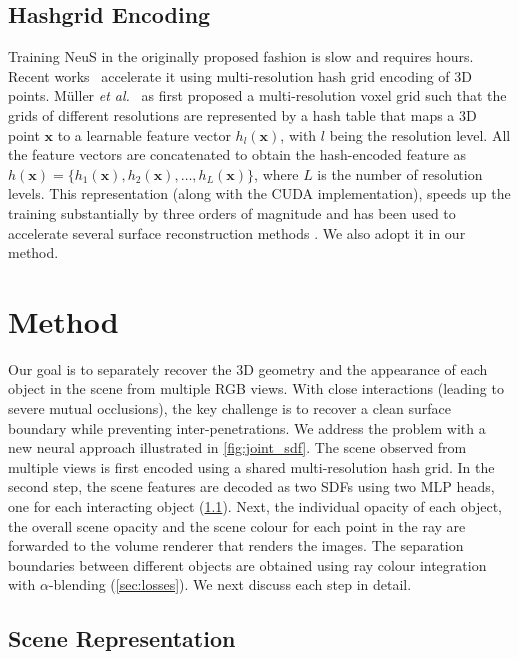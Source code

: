 \subsection{Hashgrid Encoding}
Training NeuS in the originally proposed fashion is slow and requires hours. 
Recent works~\cite{mueller2022instant, zhao2022instantnsr, neus2, rosu2023permutosdf} accelerate it using 
multi-resolution hash grid encoding of 3D points. 
Müller \textit{et al.}~\cite{mueller2022instant} as first proposed a multi-resolution voxel grid such that the grids of different resolutions are represented by a hash table that maps a 3D point $\mathbf{x}$ to a learnable feature vector $h_l(\mathbf{x})$, with $l$ being the resolution level. 
All the feature vectors are concatenated to obtain the hash-encoded feature as $h(\mathbf{x}) = \{h_1(\mathbf{x}), h_2(\mathbf{x}), \ldots, h_L(\mathbf{x})\}$, where $L$ is the number of resolution levels. 
This representation (along with the CUDA implementation), speeds up the training substantially by three orders of magnitude and has been used to accelerate several surface reconstruction methods \cite{neus2, zhao2022instantnsr}.
We also adopt it in our method. 


\section{Method} 
\label{sec:Method} 
Our goal is to separately recover the 3D geometry and the appearance of each object in the scene from multiple RGB views. 
With close interactions (leading to severe mutual occlusions), the key challenge is to recover a clean surface boundary while preventing inter-penetrations. 
We address the problem with a new neural approach illustrated in \cref{fig:joint_sdf}.
The scene observed from multiple views is first encoded using a shared multi-resolution hash grid. 
In the second step, the scene features are decoded as two SDFs using two MLP heads, one for each interacting object (\cref{sec:Joint_SDF}). 
Next, the individual opacity of each object, the overall scene opacity and the scene colour for each point in the ray are forwarded to the volume renderer that renders the images. 
The separation boundaries between different objects are obtained using ray colour integration with $\alpha$-blending (\cref{sec:losses}). 
We next discuss each step in detail. 
\subsection{Scene Representation}
\label{sec:Joint_SDF}

